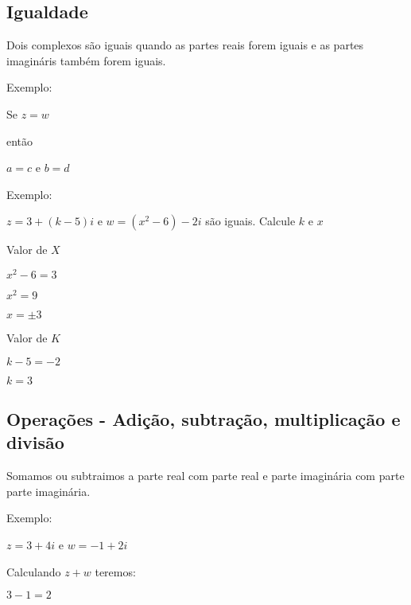\documentclass[]{article}
\begin{document}
\begin{large}
\begin{flushleft}
\subsection{Igualdade}

Dois complexos são iguais quando as partes reais forem iguais e as partes imagináris também forem iguais. \vspace{.3cm}

Exemplo: \vspace{.3cm}

\begin{center}

Se $z = w$

então

{$a = c$ e $b = d$}

\end{center}

Exemplo: \vspace{.3cm}

$z = 3+(k-5)i$ e $w = (x^2-6)-2i$ são iguais. Calcule $k$ e $x$ \vspace{.3cm}

\begin{center}

Valor de $X$

$x^2-6=3$

$x^2=9$

$x=\pm{3}$ \vspace{.3cm}

Valor de $K$

$k-5 = -2$

$k=3$
\end{center} 

\subsection{Operações - Adição, subtração, multiplicação e divisão}

Somamos ou subtraimos a parte real com parte real e parte imaginária com parte parte imaginária. \vspace{.3cm}

Exemplo: \vspace{.3cm}

\begin{center}
    $z = 3+4i$ e $w = -1+2i$
\end{center}

Calculando $z+w$ teremos: \vspace{.3cm}

\begin{center}
    $3-1 = 2$
    

\end{center}
\end{flushleft}
\end{large}
\end{document}
